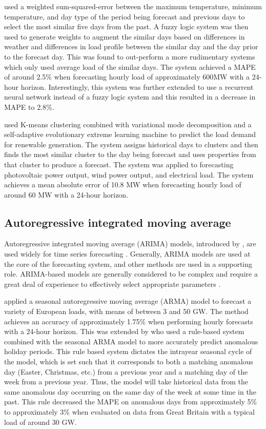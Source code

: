 \citet{Senjyu1998} used a weighted sum-squared-error between the maximum temperature, minimum temperature, and day type of the period being forecast and previous days to select the most similar five days from the past.
A fuzzy logic system was then used to generate weights to augment the similar days based on differences in weather and differences in load profile between the similar day and the day prior to the forecast day.
This was found to out-perform a more rudimentary systems which only used average load of the similar days.
The system achieved a MAPE of around 2.5\% when forecasting hourly load of approximately 600MW with a 24-hour horizon.
Interestingly, this system was further extended \cite{Senjyu2004} to use a recurrent neural network instead of a fuzzy logic system and this resulted in a decrease in MAPE to 2.8\%.

\citet{Dou2018} used K-means clustering combined with variational mode decomposition and a self-adaptive evolutionary extreme learning machine to predict the load demand for renewable generation.
The system assigns historical days to clusters and then finds the most similar cluster to the day being forecast and uses properties from that cluster to produce a forecast.
The system was applied to forecasting photovoltaic power output, wind power output, and electrical load.
The system achieves a mean absolute error of 10.8 MW when forecasting hourly load of around 60 MW with a 24-hour horizon.

\subsection{Autoregressive integrated moving average}
Autoregressive integrated moving average (ARIMA) models, introduced by \citet{Box1970}, are used widely for time series forecasting \citep{Weron2006}. 
Generally, ARIMA models are used at the core of the forecasting system, and other methods are used in a supporting role.
ARIMA-based models are generally considered to be complex and require a great deal of experience to effectively select appropriate parameters \citep{Desouky2000}.

\citet{Taylor2007} applied a seasonal autoregressive moving average (ARMA) model to forecast a variety of European loads, with means of between 3 and 50 GW.
The method achieves an accuracy of approximately 1.75\% when performing hourly forecasts with a 24-hour horizon.
This was extended by \citet{Arora2013} who used a rule-based system combined with the seasonal ARMA model to more accurately predict anomalous holiday periods.
This rule based system dictates the intrayear seasonal cycle of the model, which is set such that it corresponds to both a matching anomalous day (Easter, Christmas, etc.) from a previous year and a matching day of the week from a previous year.
Thus, the model will take historical data from the same anomalous day occurring on the same day of the week at some time in the past.
This rule decreased the MAPE on anomalous days from approximately 5\% to approximately 3\% when evaluated on data from Great Britain with a typical load of around 30 GW.

